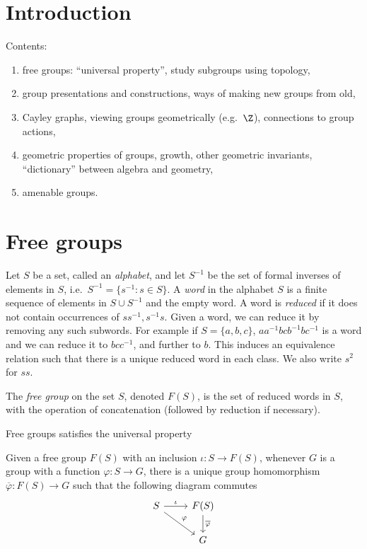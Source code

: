 \documentclass[a4paper]{article}
\begin{document}


\tableofcontents

\setcounter{section}{-1}

\section{Introduction}

Contents:
\begin{enumerate}
\item free groups: ``universal property'', study subgroups using topology,
\item group presentations and constructions, ways of making new groups from old,
\item Cayley graphs, viewing groups geometrically (e.g.\ \(\Z\)), connections to group actions,
\item geometric properties of groups, growth, other geometric invariants, ``dictionary'' between algebra and geometry,
\item amenable groups.
\end{enumerate}

\section{Free groups}

Let \(S\) be a set, called an \emph{alphabet}, and let \(S^{-1}\) be the set of formal inverses of elements in \(S\), i.e.\ \(S^{-1} = \{s^{-1}: s \in S\}\). A \emph{word} in the alphabet \(S\) is a finite sequence of elements in \(S \cup S^{-1}\) and the empty word. A word is \emph{reduced} if it does not contain occurrences of \(ss^{-1}, s^{-1}s\). Given a word, we can reduce it by removing any such subwords. For example if \(S = \{a, b, c\}\), \(aa^{-1}bcb^{-1}bc^{-1}\) is a word and we can reduce it to \(bcc^{-1}\), and further to \(b\). This induces an equivalence relation such that there is a unique reduced word in each class. We also write \(s^2\) for \(ss\).

\begin{definition}
  The \emph{free group} on the set \(S\), denoted \(F(S)\), is the set of reduced words in \(S\), with the operation of concatenation (followed by reduction if necessary).
\end{definition}

Free groups satisfies the universal property

\begin{theorem}
  Given a free group \(F(S)\) with an inclusion \(\iota: S \to F(S)\), whenever \(G\) is a group with a function \(\varphi: S \to G\), there is a unique group homomorphism \(\overline \varphi: F(S) \to G\) such that the following diagram commutes
  \[
    \begin{tikzcd}
      S \ar[r, "\iota"] \ar[dr, "\varphi"] & F(S) \ar[d, "\overline \varphi"] \\
      & G
    \end{tikzcd}
  \]
\end{theorem}
\end{document}
